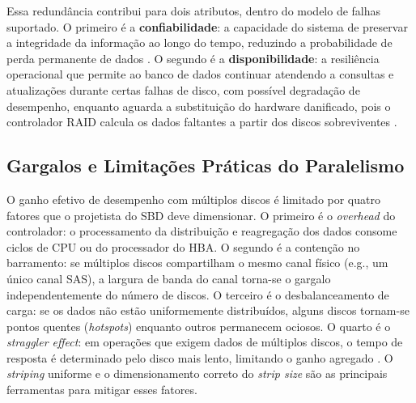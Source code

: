 \documentclass[titlepage]{article}
\begin{document}
Essa redundância contribui para dois atributos, dentro do modelo de falhas suportado. O primeiro é a \textbf{confiabilidade}: a capacidade do sistema de preservar a integridade da informação ao longo do tempo, reduzindo a probabilidade de perda permanente de dados \cite{silberschatz2020}. O segundo é a \textbf{disponibilidade}: a resiliência operacional que permite ao banco de dados continuar atendendo a consultas e atualizações durante certas falhas de disco, com possível degradação de desempenho, enquanto aguarda a substituição do hardware danificado, pois o controlador RAID calcula os dados faltantes a partir dos discos sobreviventes \cite{silberschatz2020}.

\subsection{Gargalos e Limitações Práticas do Paralelismo}
O ganho efetivo de desempenho com múltiplos discos é limitado por quatro fatores que o projetista do SBD deve dimensionar. O primeiro é o \textit{overhead} do controlador: o processamento da distribuição e reagregação dos dados consome ciclos de CPU ou do processador do HBA. O segundo é a contenção no barramento: se múltiplos discos compartilham o mesmo canal físico (e.g., um único canal SAS), a largura de banda do canal torna-se o gargalo independentemente do número de discos. O terceiro é o desbalanceamento de carga: se os dados não estão uniformemente distribuídos, alguns discos tornam-se pontos quentes (\textit{hotspots}) enquanto outros permanecem ociosos. O quarto é o \textit{straggler effect}: em operações que exigem dados de múltiplos discos, o tempo de resposta é determinado pelo disco mais lento, limitando o ganho agregado \cite{garciamolina2009}. O \textit{striping} uniforme e o dimensionamento correto do \textit{strip size} são as principais ferramentas para mitigar esses fatores.

\end{document}
